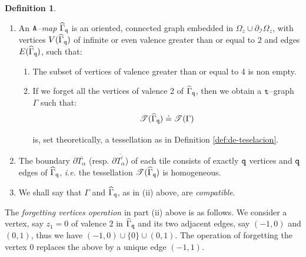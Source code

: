 \documentclass[final,3p,times]{elsarticle}
\theoremstyle{definition}
\newtheorem{definition}[theorem]{Definition}
\begin{document}
\begin{definition}
\label{definicion-de-A-map}
\begin{enumerate}[label=\arabic*),leftmargin=*] 
\item
An {\it ${\tt A}$--map} $\widehat{\Gamma}_{\tt q}$ is an 
oriented, connected graph 
embedded in  $\Omega_z \cup \partial_{\mathcal{I}} \Omega_z$, 
with vertices $V(\widehat{\Gamma}_{\tt q})$ of
infinite or 
even valence  greater than or equal to $2$
and edges $E (\widehat{\Gamma}_{\tt q})$, such that:

\begin{enumerate}[label=\roman*),leftmargin=*]
\item
The subset of vertices of valence greater
than or equal to 4 is non empty. 

\item
If we forget all the vertices
of valence 2 of $\widehat{\Gamma}_{\tt q}$, then
we obtain a ${\tt t}$--graph $\Gamma$ such that:
%
\begin{equation}
\label{eq:tessellation}
%
\mathscr{T}(\widehat{\Gamma}_{\tt q}) \doteq %
\mathscr{T}(\Gamma)
\end{equation}



\noindent
is, set theoretically, a tessellation as in Definition 
\ref{def:de-teselacion}.
\end{enumerate}

\item 
The boundary 
$\partial \overline{T_\alpha}$ 
(resp. $\partial \overline{T_{\alpha}^\prime}$) of  
each tile consists of exactly $\tt q$ vertices and $\tt q$ edges 
of $\widehat{\Gamma}_{\tt q}$,
{\it i.e.} the tessellation $\mathscr{T}(\widehat{\Gamma}_{\tt q})$ is homogeneous.

\item 
We shall say that $\Gamma$ and $\widehat{\Gamma}_{\tt q}$, as in (ii) above, are \emph{compatible}.
\end{enumerate}
\end{definition}

The {\it forgetting vertices operation}
in part (ii) above is as follows. 
We consider a vertex, say $z_1=0$ of valence 2 
in $\widehat{\Gamma}_{\tt q}$ and its two adjacent edges, say $(-1,0)$ and $(0,1)$, 
thus we have
$(-1,0) \cup \{0\} \cup (0,1)$.
The operation of forgetting
the vertex $0$ replaces the above by a unique
edge $(-1,1)$. 
\end{document}
